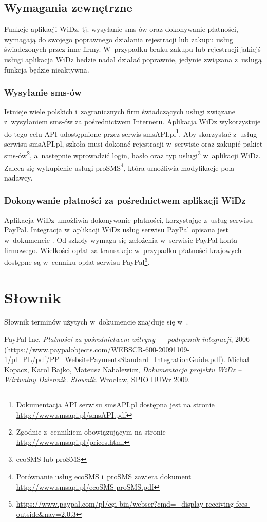 \documentclass[12pt,leqno,twoside]{mwart}
\begin{document}
\subsection{Wymagania zewnętrzne}
\noindent Funkcje aplikacji WiDz, tj. wysyłanie sms-ów oraz dokonywanie płatności, wymagają do swojego poprawnego działania rejestracji lub zakupu usług świadczonych przez inne firmy. W~przypadku braku zakupu lub rejestracji jakiejś usługi aplikacja WiDz bedzie nadal działać poprawnie, jedynie związana z~usługą funkcja będzie nieaktywna.

\subsubsection{Wysyłanie sms-ów}\label{WYSYLANIE_SMS}
\noindent Istnieje wiele polskich i~zagranicznych firm świadczących usługi związane z~wysyłaniem sms-ów za pośrednictwem Internetu. Aplikacja WiDz wykorzystuje do tego celu API udostępnione przez serwis smsAPI.pl\footnote{Dokumentacja API serwisu smsAPI.pl dostępna jest na stronie \url{http://www.smsapi.pl/smsAPI.pdf}}. Aby skorzystać z~usług serwisu smsAPI.pl, szkoła musi dokonać rejestracji w~serwisie oraz zakupić pakiet sms-ów\footnote{Zgodnie z~cennikiem obowiązującym na stronie \url{http://www.smsapi.pl/prices.html}}, a~następnie wprowadzić login, hasło oraz typ usługi\footnote{ecoSMS lub proSMS} w~aplikacji WiDz. Zaleca się wykupienie usługi proSMS\footnote{Porównanie usług ecoSMS i~proSMS zawiera dokument \hbox{\url{http://www.smsapi.pl/ecoSMS-proSMS.pdf}}}, która umożliwia modyfikacje pola nadawcy.

\subsubsection{Dokonywanie płatności za pośrednictwem aplikacji WiDz}\label{PLATNOSCI_WIDZ}
\noindent Aplikacja WiDz umożliwia dokonywanie płatności, korzystając z~usług serwisu PayPal. Integracja w~aplikacji WiDz usług serwisu PayPal opisana jest w~dokumencie \cite{PAYPAL}. Od szkoły wymaga się założenia w~serwisie PayPal konta firmowego. Wielkości opłat za transakcje w~przypadku płatności krajowych dostępne są w~cenniku opłat serwisu PayPal\footnote{\url{https://www.paypal.com/pl/cgi-bin/webscr?cmd=_display-receiving-fees-outside&nav=2.0.3}}.

\section{Słownik}
\noindent Słownik terminów użytych w~dokumencie znajduje się w~\cite{SLO}.

\begin{thebibliography}{9}
	 PayPal Inc. {\it Płatności za pośrednictwem witryny — podręcznik integracji}, 2006 (\url{https://www.paypalobjects.com/WEBSCR-600-20091109-1/pl_PL/pdf/PP_WebsitePaymentsStandard_IntegrationGuide.pdf}).
	 Michał Kopacz, Karol Bajko, Mateusz Nahalewicz, {\it Dokumentacja projektu WiDz -- Wirtualny Dziennik. Słownik}. Wrocław, SPIO IIUWr 2009.
\end{thebibliography}
\end{document}

